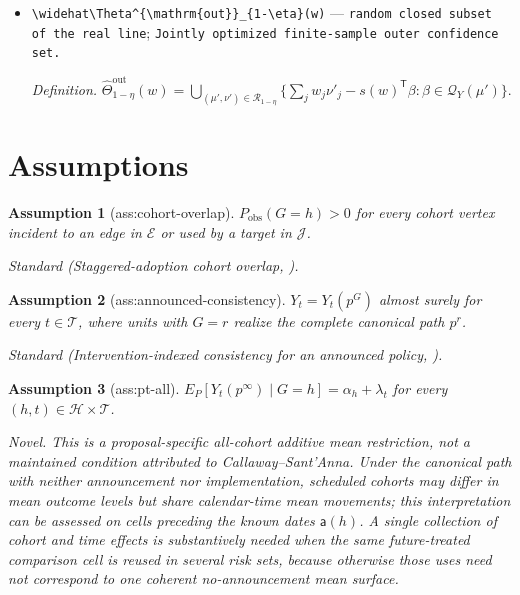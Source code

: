 \documentclass{article}
\newtheorem{assumption}{Assumption}
\begin{document}
\begin{itemize}
  \par\smallskip\noindent\emph{Definition.} \(\mathcal R_{1-\eta}\) is the Cartesian product of \([\widehat\mu_e-\rho_{h(e)},\widehat\mu_e+\rho_{h(e)}]\cap[\underline y,\overline y]\) and \([\widehat\nu_j-\rho_{g_j},\widehat\nu_j+\rho_{g_j}]\cap[\underline y,\overline y]\), using \([\underline y,\overline y]\) when the relevant cohort count is zero.
  \item \texttt{\textbackslash{}\allowbreak{}widehat\textbackslash{}\allowbreak{}Theta\textasciicircum{}\{\textbackslash{}\allowbreak{}mathrm\{out\}\allowbreak{}\}\allowbreak{}\_\allowbreak{}\{1-\allowbreak{}\textbackslash{}\allowbreak{}eta\}\allowbreak{}(w)} --- \texttt{random closed subset of the real line}; \texttt{Jointly optimized finite-\allowbreak{}sample outer confidence set.}
  \par\smallskip\noindent\emph{Definition.} \(\widehat\Theta^{\mathrm{out}}_{1-\eta}(w)=\bigcup_{(\mu',\nu')\in\mathcal R_{1-\eta}}\{\sum_jw_j\nu'_j-s(w)^{\mathsf T}\beta:\beta\in\mathcal Q_Y(\mu')\}\).
\end{itemize}

\section{Assumptions}

\begin{assumption}[ass:cohort-overlap]\label{ass:cohort-overlap}
\(P_{\mathrm{obs}}(G=h)>0\) for every cohort vertex incident to an edge in \(\mathcal E\) or used by a target in \(\mathcal J\).
\par\smallskip\noindent\emph{Standard} (Staggered-adoption cohort overlap, \cite{CallawaySantAnna2021}).
\end{assumption}

\begin{assumption}[ass:announced-consistency]\label{ass:announced-consistency}
\(Y_t=Y_t(p^G)\) almost surely for every \(t\in\mathcal T\), where units with \(G=r\) realize the complete canonical path \(p^r\).
\par\smallskip\noindent\emph{Standard} (Intervention-indexed consistency for an announced policy, \cite{PiccininniTchetgenStensrud2025}).
\end{assumption}

\begin{assumption}[ass:pt-all]\label{ass:pt-all}
\(E_P[Y_t(p^\infty)\mid G=h]=\alpha_h+\lambda_t\) for every \((h,t)\in\mathcal H\times\mathcal T\).
\par\smallskip\noindent\emph{Novel.} This is a proposal-specific all-cohort additive mean restriction, not a maintained condition attributed to Callaway--Sant'Anna. Under the canonical path with neither announcement nor implementation, scheduled cohorts may differ in mean outcome levels but share calendar-time mean movements; this interpretation can be assessed on cells preceding the known dates \(\mathsf a(h)\). A single collection of cohort and time effects is substantively needed when the same future-treated comparison cell is reused in several risk sets, because otherwise those uses need not correspond to one coherent no-announcement mean surface.
\end{assumption}
\end{document}

